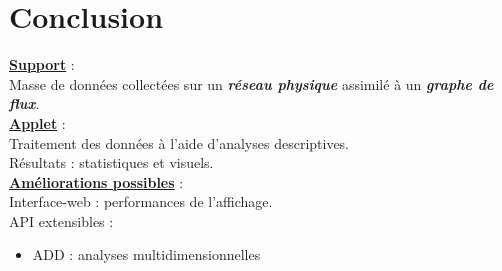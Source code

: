 	\section{Conclusion}
		\begin{frame}
			\underline{\textbf{Support}} :\\
				\hspace{1em}Masse de données collectées sur un \textbf{\textit{réseau physique}} assimilé à un \textbf{\textit{graphe de flux}}.\\
			\vspace{1em}
			\underline{\textbf{Applet}} :\\
				\hspace{1em}Traitement des données à l'aide d'analyses descriptives.\\
				\hspace{1em}Résultats : statistiques et visuels.\\
			\vspace{1em}
			\underline{\textbf{Améliorations possibles}} :\\
				\hspace{1em}Interface-web : performances de l'affichage.\\
				\hspace{1em}API extensibles :
					\hspace{1em}\begin{itemize}\item ADD : analyses multidimensionnelles\end{itemize}
		\end{frame}
	

